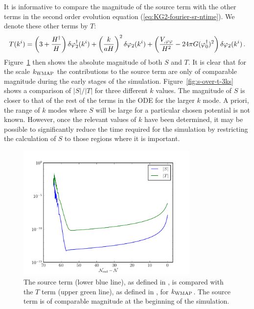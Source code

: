 %
It is informative to compare the magnitude of the source term with the
other terms in the second order evolution equation
(\ref{eq:KG2-fourier-sr-ntime}). We denote these other terms by $T$:
%
\begin{equation}
\label{eq:Tdefn}
 T(k^i) = \left(3 + \frac{H^{\dagger}}{H}\right)
\delta\varphi_{2}^{\dagger}(k^i)+ \left(\frac{k}{aH}\right)^2\delta\varphi_{2}(k^i)
+\left(\frac{V_{,\varphi\varphi}}{H^2}-{24 \pi G}(\varphi_{0}^{\dagger})^2\right)
\delta\varphi_{2}(k^i) \,.
\end{equation}
%
Figure~\ref{fig:src-vs-others} then shows the absolute magnitude of
both $S$ and $T$.  It is clear that for the scale $k_\mathrm{WMAP}$ the contributions to the
source term are only of comparable
magnitude during the early stages of the simulation.  
% 
Figure~\ref{fig:s-over-t-3ks}
shows a comparison of $|S|/|T|$ for three different $k$ values. 
The magnitude of $S$ is closer to that of the rest of the terms in the ODE for the
larger $k$ mode.
A priori, the range of $k$ modes where $S$ will be large for a particular chosen
potential is not known. However, once the relevant values of $k$ have been
determined, it may be possible to significantly reduce the time
required for the simulation by restricting the calculation of $S$ to those regions
where it is important.
%
\begin{figure}[htbp]
\centering
 \includegraphics[width=0.8\textwidth]{numerical/graphs/src-vs-t-kwmap-large}
\caption[Source term compared to $T$ term]{The source term (lower blue line), as
defined in , is
compared with the $T$ term
(upper green line), as defined in , for $k_\mathrm{WMAP}$. The source term is of
comparable magnitude at the beginning of the simulation.}
 \label{fig:src-vs-others}
\end{figure}
% 

